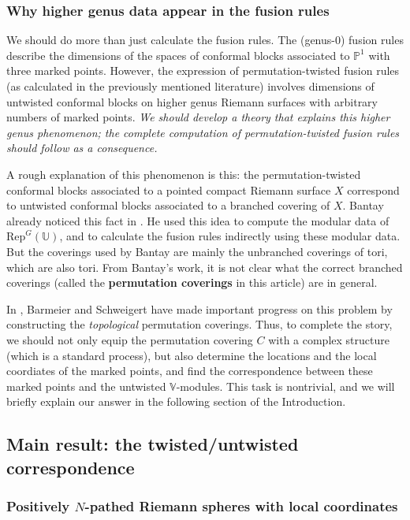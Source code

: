 \documentclass[12pt,a4paper,notitlepage]{article}
\theoremstyle{definition}
\theoremstyle{plain}
\newcommand{\Rep}{\mathrm{Rep}}
\newcommand{\Vbb}{\mathbb V}
\newcommand{\Ubb}{\mathbb U}
\newcommand{\Pbb}{\mathbb P}
\numberwithin{equation}{subsection}
\begin{document}
\subsubsection*{Why higher genus data appear in the fusion rules}


We should do more than just calculate the fusion rules. The (genus-$0$) fusion rules describe the dimensions of the spaces of conformal blocks associated to $\Pbb^1$ with three marked points. However, the expression of permutation-twisted fusion rules (as calculated in the previously mentioned literature) involves dimensions of untwisted conformal blocks on higher genus Riemann surfaces with arbitrary numbers of marked points. \textit{We should develop a theory that explains this higher genus phenomenon; the complete computation of permutation-twisted fusion rules should follow as a consequence.}

A rough explanation of this phenomenon is this: the permutation-twisted conformal blocks associated to a pointed compact Riemann surface $X$ correspond to untwisted conformal blocks associated to a branched covering of $X$. Bantay already noticed this fact in \cite{Ban98,Ban02}. He used this idea to compute the modular data of $\Rep^G(\Ubb)$, and to calculate the fusion rules indirectly using these modular data. But the coverings used by Bantay are mainly the unbranched coverings of tori, which are also tori. From Bantay's work, it is not clear what the correct branched coverings (called the \textbf{permutation coverings} in this article) are in general.


In \cite{BS11}, Barmeier and Schweigert have made important progress on this problem by constructing the \textit{topological} permutation coverings. Thus, to complete the story, we should not only equip the permutation covering $C$ with a complex structure (which is a standard process), but also determine the locations and the local coordiates of the marked points, and find the correspondence between these marked points and the untwisted $\Vbb$-modules. This task is nontrivial, and we will briefly explain our answer in the following section of the Introduction. 

\subsection{Main result: the twisted/untwisted correspondence}


\subsubsection*{Positively $N$-pathed Riemann spheres with local coordinates}
\end{document}
